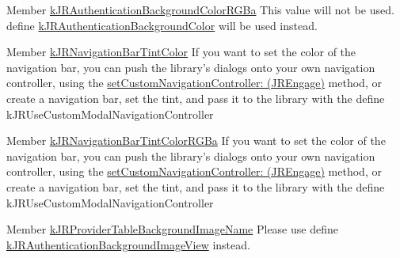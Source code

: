 \label{deprecated__deprecated000004}
\hypertarget{deprecated__deprecated000004}{}
 
\begin{DoxyDescription}
\item[Member \hyperlink{group__custom_interface_gae0c84a976949aa4eccecc123786efb3c}{kJRAuthenticationBackgroundColorRGBa} ]This value will not be used. define \hyperlink{group__custom_interface_gacfe014997457d27386eff69eb731ce0f}{kJRAuthenticationBackgroundColor} will be used instead. 
\end{DoxyDescription}

\label{deprecated__deprecated000001}
\hypertarget{deprecated__deprecated000001}{}
 
\begin{DoxyDescription}
\item[Member \hyperlink{group__custom_interface_ga7c7ed7dac155537c9bc14531c5cec3cb}{kJRNavigationBarTintColor} ]If you want to set the color of the navigation bar, you can push the library's dialogs onto your own navigation controller, using the \hyperlink{class_j_r_engage_a6c704bbff377d20603e6b52bd0ae17f1}{setCustomNavigationController: (JREngage)} method, or create a navigation bar, set the tint, and pass it to the library with the define kJRUseCustomModalNavigationController 




\end{DoxyDescription}

\label{deprecated__deprecated000003}
\hypertarget{deprecated__deprecated000003}{}
 
\begin{DoxyDescription}
\item[Member \hyperlink{group__custom_interface_gabda4f66c5cde44bbeaa6a993f4793ac5}{kJRNavigationBarTintColorRGBa} ]If you want to set the color of the navigation bar, you can push the library's dialogs onto your own navigation controller, using the \hyperlink{class_j_r_engage_a6c704bbff377d20603e6b52bd0ae17f1}{setCustomNavigationController: (JREngage)} method, or create a navigation bar, set the tint, and pass it to the library with the define kJRUseCustomModalNavigationController 
\end{DoxyDescription}

\label{deprecated__deprecated000006}
\hypertarget{deprecated__deprecated000006}{}
 
\begin{DoxyDescription}
\item[Member \hyperlink{group__custom_interface_ga893fb6e20be0c6658e81a6a5d5c121f0}{kJRProviderTableBackgroundImageName} ]Please use define \hyperlink{group__custom_interface_ga68a4950b1b3834ce60218856f596059f}{kJRAuthenticationBackgroundImageView} instead. 
\end{DoxyDescription}

